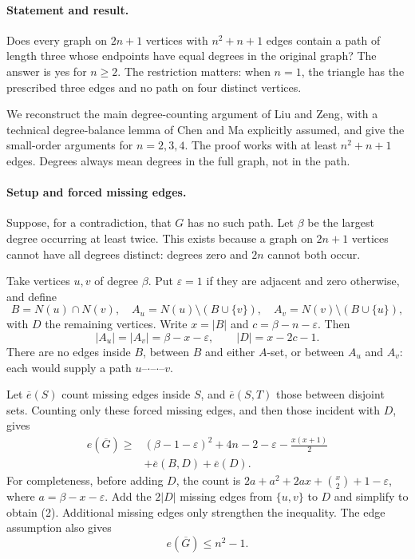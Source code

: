 \paragraph{Statement and result.}
Does every graph on \(2n+1\) vertices with \(n^2+n+1\) edges contain a path of length three whose endpoints have equal degrees in the original graph? The answer is yes for \(n\geq2\). The restriction matters: when \(n=1\), the triangle has the prescribed three edges and no path on four distinct vertices.

We reconstruct the main degree-counting argument of Liu and Zeng, with a technical degree-balance lemma of Chen and Ma explicitly assumed, and give the small-order arguments for \(n=2,3,4\). The proof works with at least \(n^2+n+1\) edges. Degrees always mean degrees in the full graph, not in the path.

\paragraph{Setup and forced missing edges.}
Suppose, for a contradiction, that \(G\) has no such path. Let \(\beta\) be the largest degree occurring at least twice. This exists because a graph on \(2n+1\) vertices cannot have all degrees distinct: degrees zero and \(2n\) cannot both occur.

Take vertices \(u,v\) of degree \(\beta\). Put \(\varepsilon=1\) if they are adjacent and zero otherwise, and define
\[
 B=N(u)\cap N(v),\quad
 A_u=N(u)\setminus(B\cup\{v\}),\quad
 A_v=N(v)\setminus(B\cup\{u\}),
\]
with \(D\) the remaining vertices. Write \(x=|B|\) and \(c=\beta-n-\varepsilon\). Then
\[
 |A_u|=|A_v|=\beta-x-\varepsilon,
 \qquad |D|=x-2c-1.
\tag{1}
\]
There are no edges inside \(B\), between \(B\) and either \(A\)-set, or between \(A_u\) and \(A_v\): each would supply a path \(u\)--\(\cdot\)--\(\cdot\)--\(v\).

Let \(\overline e(S)\) count missing edges inside \(S\), and \(\overline e(S,T)\) those between disjoint sets. Counting only these forced missing edges, and then those incident with \(D\), gives
\[
 \begin{split}
 e(\overline G)\geq{}&(\beta-1-\varepsilon)^2+4n-2-\varepsilon
       -\frac{x(x+1)}2\\
 &+\overline e(B,D)+\overline e(D).
 \end{split}
\tag{2}
\]
For completeness, before adding \(D\), the count is
\(2a+a^2+2ax+\binom x2+1-\varepsilon\), where \(a=\beta-x-\varepsilon\). Add the \(2|D|\) missing edges from \(\{u,v\}\) to \(D\) and simplify to obtain (2). Additional missing edges only strengthen the inequality. The edge assumption also gives
\[
 e(\overline G)\leq n^2-1.
\tag{3}
\]

